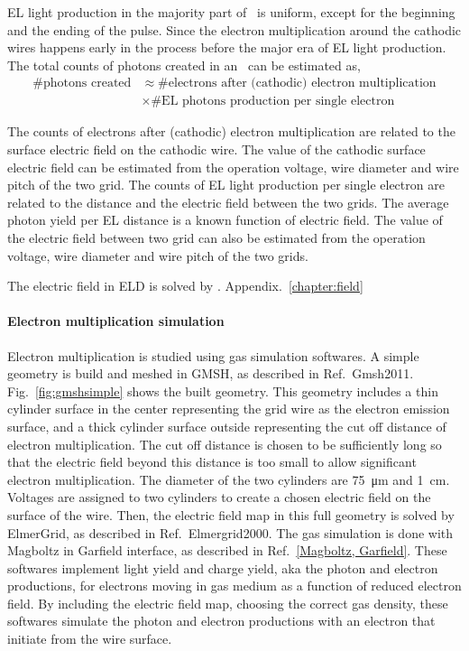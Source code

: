 EL light production in the majority part of \eep\ is uniform, except for the beginning and the ending of the pulse. Since the electron multiplication around the cathodic wires happens early in the process before the major era of EL light production. The total counts of photons created in an \eep\  can be estimated as,
\begin{align}
	\# \text{photons created} & \approx \# \text{electrons after (cathodic) electron multiplication} \\
	& \times \# \text{EL photons production per single electron}
\end{align}

The counts of electrons after (cathodic) electron multiplication are related to the surface electric field on the cathodic wire. The value of the cathodic surface electric field can be estimated from the operation voltage, wire diameter and wire pitch of the two grid. The counts of EL light production per single electron are related to the distance and the electric field between the two grids. The average photon yield per EL distance is a known function of electric field. The value of the electric field between two grid can also be estimated from the operation voltage, wire diameter and wire pitch of the two grids. 

The electric field in ELD is solved by . Appendix.~\ref{chapter:field}

\paragraph{Electron multiplication simulation}Electron multiplication is studied using gas simulation softwares. A simple geometry is build and meshed in GMSH, as described in Ref.~{Gmsh2011}. Fig.~\ref{fig:gmshsimple} shows the built geometry. This geometry includes a thin cylinder surface in the center representing the grid wire as the electron emission surface, and a thick cylinder surface outside representing the cut off distance of electron multiplication. The cut off distance is chosen to be sufficiently long so that the electric field beyond this distance is too small to allow significant electron multiplication. The diameter of the two cylinders are \SI{75}{\um} and \SI{1}{cm}. Voltages are assigned to two cylinders to create a chosen electric field on the surface of the wire. Then, the electric field map in this full geometry is solved by ElmerGrid, as described in Ref.~{Elmergrid2000}.  The gas simulation is done with Magboltz in Garfield interface, as described in Ref.~\ref{Magboltz, Garfield}. These softwares implement light yield and charge yield, aka the photon and electron productions, for electrons moving in gas medium as a function of reduced electron field. By including the electric field map, choosing the correct gas density, these softwares simulate the photon and electron productions with an electron that initiate from the wire surface. 

